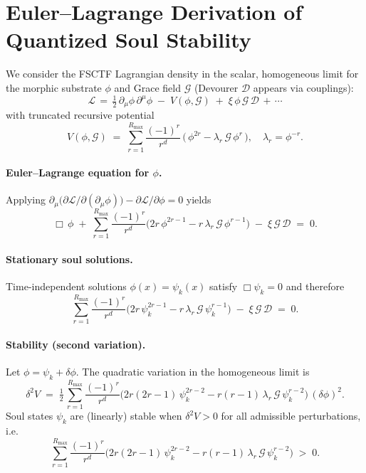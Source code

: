 \section{Euler--Lagrange Derivation of Quantized Soul Stability}
\label{sec:el_soul_stability}

We consider the FSCTF Lagrangian density in the scalar, homogeneous limit
for the morphic substrate $\phi$ and Grace field $\mathcal G$ (Devourer $\mathcal D$
appears via couplings):
\[
\mathcal L \,=\, \tfrac12\,\partial_\mu\phi\,\partial^\mu\phi\; -\; V(\phi,\mathcal G)\; +\; \xi\,\phi\,\mathcal G\,\mathcal D\, +\,\cdots
\]
with truncated recursive potential
\[ V(\phi,\mathcal G) \;=\; \sum_{r=1}^{R_\max} \frac{(-1)^r}{r^d}\,\big(\,\phi^{2r} - \lambda_r\,\mathcal G\,\phi^r\,\big),\quad \lambda_r=\phi^{-r}. \]

\paragraph{Euler--Lagrange equation for $\phi$.}
Applying $\partial_\mu\big(\partial\mathcal L/\partial(\partial_\mu\phi)\big)-\partial\mathcal L/\partial\phi=0$ yields
\begin{equation}
\Box\,\phi\; +\; \sum_{r=1}^{R_\max}\frac{(-1)^r}{r^d}\Big(2r\,\phi^{2r-1} - r\,\lambda_r\,\mathcal G\,\phi^{r-1}\Big)\; -\; \xi\,\mathcal G\,\mathcal D \;=\; 0.
\end{equation}

\paragraph{Stationary soul solutions.}
Time-independent solutions $\phi(x)=\psi_k(x)$ satisfy $\Box\psi_k=0$ and therefore
\begin{equation}
\sum_{r=1}^{R_\max}\frac{(-1)^r}{r^d}\Big(2r\,\psi_k^{2r-1} - r\,\lambda_r\,\mathcal G\,\psi_k^{r-1}\Big)\; -\; \xi\,\mathcal G\,\mathcal D \;=\; 0.
\label{eq:stationary_soul}
\end{equation}

\paragraph{Stability (second variation).}
Let $\phi=\psi_k+\delta\phi$. The quadratic variation in the homogeneous limit is
\begin{equation}
\delta^2 V \;=\; \tfrac12\,\sum_{r=1}^{R_\max}\frac{(-1)^r}{r^d}\Big(2r(2r-1)\,\psi_k^{2r-2} - r(r-1)\,\lambda_r\,\mathcal G\,\psi_k^{r-2}\Big)\,(\delta\phi)^2.
\end{equation}
Soul states $\psi_k$ are (linearly) stable when $\delta^2 V>0$ for all admissible perturbations, i.e.
\begin{equation}
\sum_{r=1}^{R_\max}\frac{(-1)^r}{r^d}\Big(2r(2r-1)\,\psi_k^{2r-2} - r(r-1)\,\lambda_r\,\mathcal G\,\psi_k^{r-2}\Big)\;>\;0.
\end{equation}


